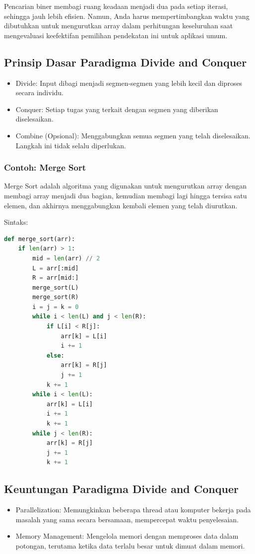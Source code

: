 \documentclass{article}
\begin{document}
Pencarian biner membagi ruang keadaan menjadi dua pada setiap iterasi, sehingga jauh lebih efisien. Namun, Anda harus mempertimbangkan waktu yang dibutuhkan untuk mengurutkan array dalam perhitungan keseluruhan saat mengevaluasi keefektifan pemilihan pendekatan ini untuk aplikasi umum.

\subsection{Prinsip Dasar Paradigma Divide and Conquer}
\begin{itemize}
    \item Divide: Input dibagi menjadi segmen-segmen yang lebih kecil dan diproses secara individu.
    \item Conquer: Setiap tugas yang terkait dengan segmen yang diberikan diselesaikan.
    \item Combine (Opsional): Menggabungkan semua segmen yang telah diselesaikan. Langkah ini tidak selalu diperlukan.
\end{itemize}

\subsubsection{Contoh: Merge Sort}
Merge Sort adalah algoritma yang digunakan untuk mengurutkan array dengan membagi array menjadi dua bagian, kemudian membagi lagi hingga tersisa satu elemen, dan akhirnya menggabungkan kembali elemen yang telah diurutkan.

Sintaks:
\begin{lstlisting}[language=Python, caption={}, captionpos=b]
def merge_sort(arr):
    if len(arr) > 1:
        mid = len(arr) // 2
        L = arr[:mid]
        R = arr[mid:]
        merge_sort(L)
        merge_sort(R)
        i = j = k = 0
        while i < len(L) and j < len(R):
            if L[i] < R[j]:
                arr[k] = L[i]
                i += 1
            else:
                arr[k] = R[j]
                j += 1
            k += 1
        while i < len(L):
            arr[k] = L[i]
            i += 1
            k += 1
        while j < len(R):
            arr[k] = R[j]
            j += 1
            k += 1
\end{lstlisting}

\subsection{Keuntungan Paradigma Divide and Conquer}
\begin{itemize}
    \item Parallelization: Memungkinkan beberapa thread atau komputer bekerja pada masalah yang sama secara bersamaan, mempercepat waktu penyelesaian.
    \item Memory Management: Mengelola memori dengan memproses data dalam potongan, terutama ketika data terlalu besar untuk dimuat dalam memori.
\end{itemize}
\end{document}

